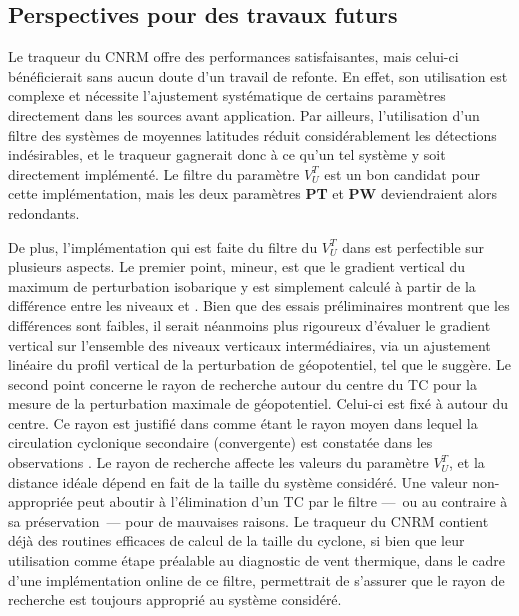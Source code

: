 \documentclass[../main.tex]{subfiles}
\begin{document}
\subsection*{Perspectives pour des travaux futurs}

Le traqueur du CNRM offre des performances satisfaisantes, mais celui-ci bénéficierait sans aucun doute d'un travail de refonte. En effet, son utilisation est
complexe et nécessite l'ajustement systématique de certains paramètres directement dans les sources avant application. Par ailleurs, l'utilisation d'un filtre
des systèmes de moyennes latitudes réduit considérablement les détections indésirables, et le traqueur gagnerait donc à ce qu'un tel système y soit
directement implémenté. Le filtre du paramètre $V_U^T$ est un bon candidat pour cette implémentation, mais les deux paramètres \textbf{PT} et \textbf{PW}
deviendraient alors redondants.


De plus, l'implémentation qui est faite du filtre du $V_U^T$ dans \textcite{dulac_assessing_2023} est perfectible sur plusieurs aspects. Le premier point,
mineur, est que le gradient vertical du maximum de perturbation isobarique y est simplement calculé à partir de la différence entre les niveaux  et
. Bien que des essais préliminaires montrent que les différences sont faibles, il serait néanmoins plus rigoureux d'évaluer le gradient vertical sur
l'ensemble des niveaux verticaux intermédiaires, via un ajustement linéaire du profil vertical de la perturbation de géopotentiel, tel que
\textcite{hart_cyclone_2003} le suggère. Le second point concerne le rayon de recherche autour du centre du TC pour la mesure de la perturbation maximale de
géopotentiel. Celui-ci est fixé à  autour du centre. Ce rayon est justifié dans \textcite{hart_cyclone_2003} comme étant le rayon moyen dans lequel la
circulation cyclonique secondaire (convergente) est constatée dans les observations \parencite{frank_structure_1977}. Le rayon de recherche affecte les valeurs
du paramètre $V_U^T$, et la distance idéale dépend en fait de la taille du système considéré. Une valeur non-appropriée peut aboutir à l'élimination d'un TC par
le filtre ---~ou au contraire à sa préservation~--- pour de mauvaises raisons. Le traqueur du CNRM contient déjà des routines efficaces de calcul de la taille
du cyclone, si bien que leur utilisation comme étape préalable au diagnostic de vent thermique, dans le cadre d'une implémentation online de ce filtre,
permettrait de s'assurer que le rayon de recherche est toujours approprié au système considéré.
\end{document}
